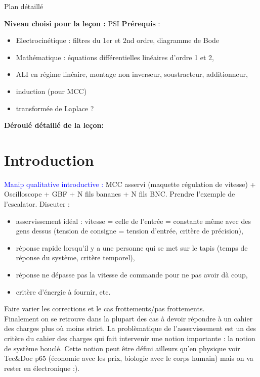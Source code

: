\begin{reportBlock}{Plan détaillé}

  \textbf{Niveau choisi pour la leçon :} PSI
  \newline
  \textbf{Prérequis} : 
  \begin{itemize}
    \item Electrocinétique : filtres du 1er et 2nd ordre, diagramme de Bode
    \item Mathématique : équations différentielles linéaires d'ordre 1 et 2,
    \item ALI en régime linéaire, montage non inverseur, soustracteur, additionneur,
    \item induction (pour MCC)
    \item transformée de Laplace ?
    
  \end{itemize}

  \textbf{Déroulé détaillé de la leçon: }  
  
  \section*{Introduction}
\textcolor{blue}{Manip qualitative introductive :} MCC asservi (maquette régulation de vitesse) + Oscilloscope + GBF + N fils bananes + N fils BNC. Prendre l'exemple de l'escalator. Discuter : 
\begin{itemize}
    \item asservissement idéal : vitesse = celle de l'entrée = constante même avec des gens dessus (tension de consigne = tension d'entrée, critère de précision),
    \item réponse rapide lorsqu'il y a une personne qui se met sur le tapis (temps de réponse du système, critère temporel),
    \item réponse ne dépasse pas la vitesse de commande pour ne pas avoir dà coup,
    \item critère d'énergie à fournir, etc.
\end{itemize}
Faire varier les corrections et le cas frottements/pas frottements.\\

Finalement on se retrouve dans la plupart des cas à devoir répondre à un cahier des charges plus où moins strict. La problèmatique de l'asservissement est un des critère du cahier des charges qui fait intervenir une notion importante : la notion de système bouclé. Cette notion peut être défini ailleurs qu'en physique voir Tec\&Doc p65 (économie avec les prix, biologie avec le corps humain) mais on va rester en électronique :).


\end{reportBlock}
